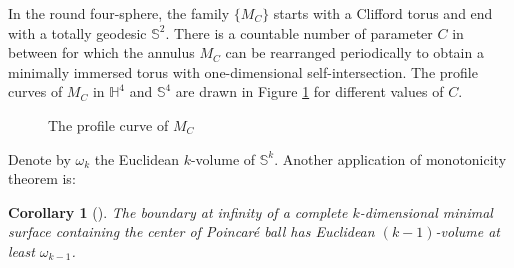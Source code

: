 \documentclass[11pt]{article}
\newtheorem{corollary}[theorem]{Corollary}
\begin{document}
In the round four-sphere, the family \(\{M_C\}\) starts with a Clifford torus and end
with a totally geodesic \(\mathbb{S}^2\). There is a countable number of parameter \(C\) in between for which the annulus \(M_C\) can be rearranged periodically to
obtain a minimally immersed torus with one-dimensional self-intersection.
The profile curves of \(M_C\) in \(\mathbb{H}^4\) and
\(\mathbb{S}^4\) are drawn in Figure \ref{fig:min-HS} for different values of \(C\). 

\begin{figure}%
    \centering
    \qquad
    \caption{The profile curve of \( M_C \)}%
    \label{fig:min-HS}%
\end{figure}

Denote by  \(\omega_{k}\) the Euclidean \(k\)-volume of \(\mathbb{S}^{k}\). Another application of monotonicity theorem is:
\begin{corollary}[]
\label{cor:intro-2pi}
The boundary at infinity of a complete \(k\)-dimensional minimal surface containing the center of
Poincaré ball has Euclidean \((k-1)\)-volume at least \(\omega_{k-1}\).
\end{corollary}
\end{document}
